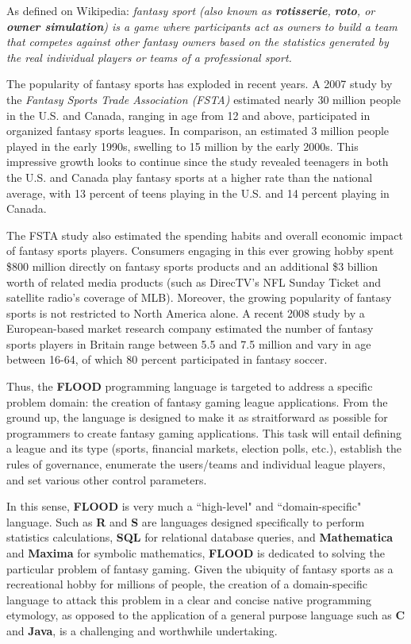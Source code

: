 \documentclass[12pt]{report}
\begin{document}
\begin{doublespace}
As defined on Wikipedia: \textit{fantasy sport (also known as \textbf{rotisserie}, \textbf{roto}, or \textbf{owner simulation}) is a game where participants act as owners to build a team that competes against other fantasy owners based on the statistics generated by the real individual players or teams of a professional sport.}

The popularity of fantasy sports has exploded in recent years. A 2007 study by the \textit{Fantasy Sports Trade Association (FSTA)} estimated  nearly 30 million people in the U.S. and Canada, ranging in age from 12 and above, participated in organized fantasy sports leagues. In comparison, an estimated 3 million people played in the early 1990s, swelling to 15 million by the early 2000s. This impressive growth looks to continue since the study revealed teenagers in both the U.S. and Canada play fantasy sports at a higher rate than the national average, with 13 percent of teens playing in the U.S. and 14 percent playing in Canada.

The FSTA study also estimated the spending habits and overall economic impact of fantasy sports players. Consumers engaging in this ever growing hobby spent \$800 million directly on fantasy sports products and an additional \$3 billion worth of related media products (such as DirecTV's NFL Sunday Ticket and satellite radio's coverage of MLB). Moreover, the growing popularity of fantasy sports is not restricted to North America alone. A recent 2008 study by a European-based market research company estimated the number of fantasy sports players in Britain range between 5.5 and 7.5 million and vary in age between 16-64, of which 80 percent participated in fantasy soccer.

Thus, the \textbf{FLOOD} programming language is targeted to address a specific problem domain: the creation of fantasy gaming league applications. From the ground up, the language is designed to make it as straitforward as possible for programmers to create fantasy gaming applications. This task will entail defining a league and its type (sports, financial markets, election polls, etc.), establish the rules of governance, enumerate the users/teams and individual league players, and set various other control parameters. 

In this sense, \textbf{FLOOD} is very much a ``high-level" and ``domain-specific" language. Such as \textbf{R} and \textbf{S} are languages designed specifically to perform statistics calculations, \textbf{SQL} for relational database queries, and \textbf{Mathematica} and \textbf{Maxima} for symbolic mathematics, \textbf{FLOOD} is dedicated to solving the particular problem of fantasy gaming. Given the ubiquity of fantasy sports as a recreational hobby for millions of people, the creation of a domain-specific language to attack this problem in a clear and concise native programming etymology, as opposed to the application of a general purpose language such as \textbf{C} and \textbf{Java}, is a challenging and worthwhile undertaking.
\end{doublespace}
\end{document}
